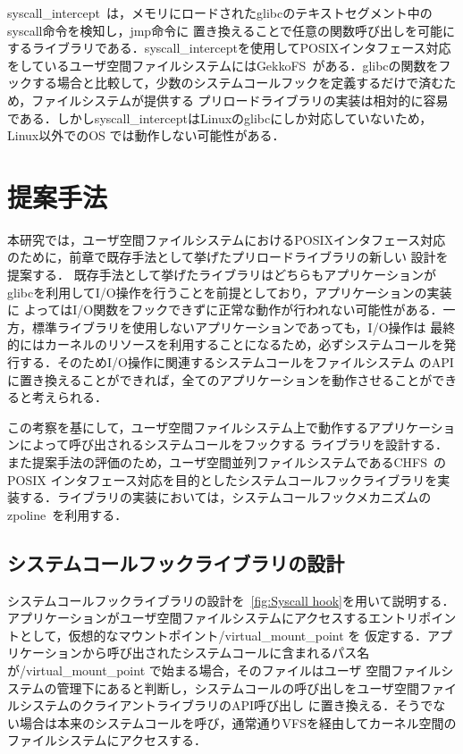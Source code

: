 \documentclass[a4paper,11pt]{jreport}
\begin{document}
syscall\_intercept~\cite{syscall-intercept}は，メモリにロードされたglibcのテキストセグメント中のsyscall命令を検知し，jmp命令に
置き換えることで任意の関数呼び出しを可能にするライブラリである．syscall\_interceptを使用してPOSIXインタフェース対応をしているユーザ空間ファイルシステムにはGekkoFS~\cite{8514892}がある．glibcの関数をフックする場合と比較して，少数のシステムコールフックを定義するだけで済むため，ファイルシステムが提供する
プリロードライブラリの実装は相対的に容易である．しかしsyscall\_interceptはLinuxのglibcにしか対応していないため，Linux以外でのOS
では動作しない可能性がある．

\chapter{提案手法}
本研究では，ユーザ空間ファイルシステムにおけるPOSIXインタフェース対応のために，前章で既存手法として挙げたプリロードライブラリの新しい
設計を提案する．
既存手法として挙げたライブラリはどちらもアプリケーションがglibcを利用してI/O操作を行うことを前提としており，アプリケーションの実装に
よってはI/O関数をフックできずに正常な動作が行われない可能性がある．一方，標準ライブラリを使用しないアプリケーションであっても，I/O操作は
最終的にはカーネルのリソースを利用することになるため，必ずシステムコールを発行する．そのためI/O操作に関連するシステムコールをファイルシステム
のAPIに置き換えることができれば，全てのアプリケーションを動作させることができると考えられる．

この考察を基にして，ユーザ空間ファイルシステム上で動作するアプリケーションによって呼び出されるシステムコールをフックする
ライブラリを設計する．また提案手法の評価のため，ユーザ空間並列ファイルシステムであるCHFS~\cite{tatebe2022chfs}のPOSIX
インタフェース対応を目的としたシステムコールフックライブラリを実装する．ライブラリの実装においては，システムコールフックメカニズムの
zpoline~\cite{288689}を利用する．

\section{システムコールフックライブラリの設計}
システムコールフックライブラリの設計を\figurename~\ref{fig:Syscall hook}を用いて説明する．アプリケーションがユーザ空間ファイルシステムにアクセスするエントリポイントとして，仮想的なマウントポイント/virtual\_mount\_point を
仮定する．アプリケーションから呼び出されたシステムコールに含まれるパス名が/virtual\_mount\_point で始まる場合，そのファイルはユーザ
空間ファイルシステムの管理下にあると判断し，システムコールの呼び出しをユーザ空間ファイルシステムのクライアントライブラリのAPI呼び出し
に置き換える．そうでない場合は本来のシステムコールを呼び，通常通りVFSを経由してカーネル空間のファイルシステムにアクセスする．
\end{document}
